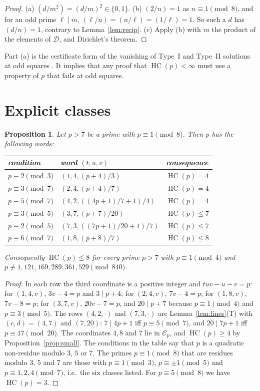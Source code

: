 \documentclass[11pt,reqno]{amsart}
\newtheorem{proposition}[theorem]{Proposition}
\theoremstyle{definition}
\newcommand{\cC}{\mathcal C}
\newcommand{\HC}{\operatorname{HC}}
\begin{document}
\begin{proof}
(a) $(d/m^2)=(d/m)^2\in\{0,1\}$.  (b) $(2/n)=1$ as $n\equiv1\pmod8$, and
for an odd prime $\ell\mid m$, $(\ell/n)=(n/\ell)=(1/\ell)=1$.  So such a
$d$ has $(d/n)=1$, contrary to Lemma~\ref{lem:recip}.  (c) Apply (b) with
$m$ the product of the elements of $\mathcal D$, and Dirichlet's theorem.
\end{proof}

Part (a) is the certificate form of the vanishing of Type~I and Type~II
solutions at odd squares \cite[Prop.~1.6]{ET}.  It implies that any proof
that $\HC(p)<\infty$ must use a property of $p$ that fails at odd squares.

\section{Explicit classes}\label{sec:classes}

\begin{proposition}\label{prop:mordell}
Let $p>7$ be a prime with $p\equiv1\pmod8$.  Then $p$ has the following
words:
\begin{center}
\begin{tabular}{lll}
\toprule
condition & word $(t,u,v)$ & consequence\\
\midrule
$p\equiv2\pmod3$ & $(1,4,(p+4)/3)$ & $\HC(p)=4$\\
$p\equiv3\pmod7$ & $(2,4,(p+4)/7)$ & $\HC(p)=4$\\
$p\equiv5\pmod7$ & $(4,2,((4p+1)/7+1)/4)$ & $\HC(p)=4$\\
$p\equiv3\pmod5$ & $(3,7,(p+7)/20)$ & $\HC(p)\le7$\\
$p\equiv2\pmod5$ & $(7,3,((7p+1)/20+1)/7)$ & $\HC(p)\le7$\\
$p\equiv6\pmod7$ & $(1,8,(p+8)/7)$ & $\HC(p)\le8$\\
\bottomrule
\end{tabular}
\end{center}
Consequently $\HC(p)\le8$ for every prime $p>7$ with $p\equiv1\pmod4$ and
$p\not\equiv1,121,169,289,361,529\pmod{840}$.
\end{proposition}

\begin{proof}
In each row the third coordinate is a positive integer and
$tuv-u-v=p$: for $(1,4,v)$, $3v-4=p$ and $3\mid p+4$; for $(2,4,v)$,
$7v-4=p$; for $(1,8,v)$, $7v-8=p$; for $(3,7,v)$, $20v-7=p$, and
$20\mid p+7$ because $p\equiv1\pmod4$ and $p\equiv3\pmod5$.  The rows
$(4,2,\cdot)$ and $(7,3,\cdot)$ are Lemma~\ref{lem:lines}(T) with
$(c,d)=(4,7)$ and $(7,20)$: $7\mid4p+1$ iff $p\equiv5\pmod7$, and
$20\mid7p+1$ iff $p\equiv17\pmod{20}$.  The coordinates $4,8$ and $7$ lie
in $\cC_p$, and $\HC(p)\ge4$ by Proposition~\ref{prop:small}.  The
conditions in the table say that $p$ is a quadratic non-residue modulo $3$,
$5$ or $7$.  The primes $p\equiv1\pmod8$ that are residues modulo $3$,
$5$ and $7$ are those with $p\equiv1\pmod 3$, $p\equiv\pm1\pmod5$ and
$p\equiv1,2,4\pmod7$, i.e.\ the six classes listed.  For
$p\equiv5\pmod 8$ we have $\HC(p)=3$.
\end{proof}
\end{document}
